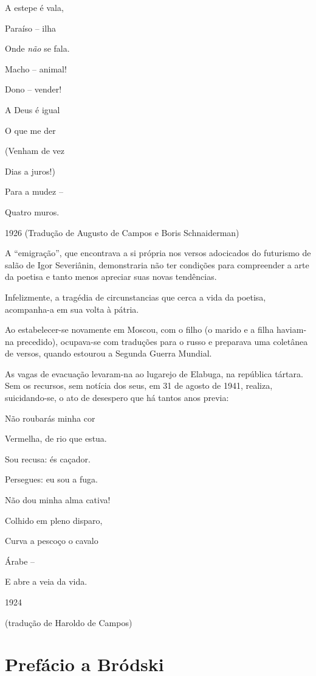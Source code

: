 A estepe é vala,

Paraíso -- ilha

Onde \emph{não} se fala.

Macho -- animal!

Dono -- vender!

A Deus é igual

O que me der

(Venham de vez

Dias a juros!)

Para a mudez --

Quatro muros.

1926 (Tradução de Augusto de Campos e Boris Schnaiderman)

A ``emigração'', que encontrava a si própria nos versos adocicados do
futurismo de salão de Igor Severiânin, demonstraria não ter condições
para compreender a arte da poetisa e tanto menos apreciar suas novas
tendências.

Infelizmente, a tragédia de circunstancias que cerca a vida da poetisa,
acompanha-a em sua volta à pátria.

Ao estabelecer-se novamente em Moscou, com o filho (o marido e a filha
haviam-na precedido), ocupava-se com traduções para o russo e preparava
uma coletânea de versos, quando estourou a Segunda Guerra Mundial.

As vagas de evacuação levaram-na ao lugarejo de Elabuga, na república
tártara. Sem os recursos, sem notícia dos seus, em 31 de agosto de 1941,
realiza, suicidando-se, o ato de desespero que há tantos anos previa:

Não roubarás minha cor

Vermelha, de rio que estua.

Sou recusa: és caçador.

Persegues: eu sou a fuga.

Não dou minha alma cativa!

Colhido em pleno disparo,

Curva a pescoço o cavalo

Árabe --

E abre a veia da vida.

1924

(tradução de Haroldo de Campos)

\chapter{Prefácio a Bródski}

